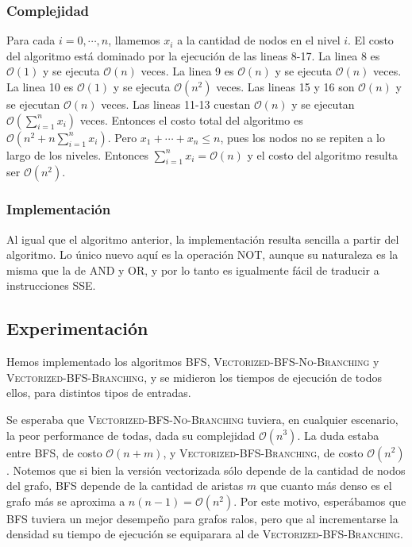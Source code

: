 \subsubsection{Complejidad}
Para cada $i = 0, \cdots, n$, llamemos $x_i$ a la cantidad de nodos en el nivel $i$. El costo del algoritmo está dominado por la ejecución de las lineas 8-17. La linea 8 es $\mathcal{O}(1)$ y se ejecuta $\mathcal{O}(n)$ veces. La linea 9 es $\mathcal{O}(n)$ y se ejecuta $\mathcal{O}(n)$ veces. La linea 10 es $\mathcal{O}(1)$ y se ejecuta $\mathcal{O}(n^2)$ veces. Las lineas 15 y 16 son $\mathcal{O}(n)$ y se ejecutan $\mathcal{O}(n)$ veces. Las lineas 11-13 cuestan $\mathcal{O}(n)$ y se ejecutan $\mathcal{O}\left(\sum_{i = 1}^{n} {x_i}\right)$ veces. Entonces el costo total del algoritmo es $\mathcal{O}\left(n^2 + n \sum_{i = 1}^{n}{x_i}\right)$. Pero $x_1 + \cdots + x_n \leq n$, pues los nodos no se repiten a lo largo de los niveles. Entonces $\sum_{i = 1}^{n} {x_i} = \mathcal{O}(n)$ y el costo del algoritmo resulta ser $\mathcal{O}(n^2)$.

\subsubsection{Implementación}

Al igual que el algoritmo anterior, la implementación resulta sencilla a partir del algoritmo. Lo único nuevo aquí es la operación \textsf{NOT}, aunque su naturaleza es la misma que la de \textsf{AND} y \textsf{OR}, y por lo tanto es igualmente fácil de traducir a instrucciones SSE.

\subsection{Experimentación}

Hemos implementado los algoritmos \textsc{BFS}, \textsc{Vectorized-BFS-No-Branching} y \textsc{Vectorized-BFS-Branching}, y se midieron los tiempos de ejecución de todos ellos, para distintos tipos de entradas.

Se esperaba que \textsc{Vectorized-BFS-No-Branching} tuviera, en cualquier escenario, la peor performance de todas, dada su complejidad $\mathcal{O}(n^3)$. La duda estaba entre \textsc{BFS}, de costo $\mathcal{O}(n + m)$, y \textsc{Vectorized-BFS-Branching}, de costo $\mathcal{O}(n^2)$. Notemos que si bien la versión vectorizada sólo depende de la cantidad de nodos del grafo, \textsc{BFS} depende de la cantidad de aristas $m$ que cuanto más denso es el grafo más se aproxima a $n(n - 1) = \mathcal{O}(n^2)$. Por este motivo, esperábamos que \textsc{BFS} tuviera un mejor desempeño para grafos ralos, pero que al incrementarse la densidad su tiempo de ejecución se equiparara al de \textsc{Vectorized-BFS-Branching}.

